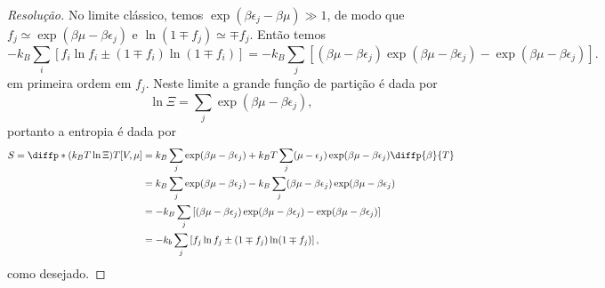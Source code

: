 \begin{proof}[Resolução]
    No limite clássico, temos \(\exp(\beta \epsilon_j - \beta \mu) \gg 1\), de modo que \(f_j \simeq \exp(\beta \mu - \beta \epsilon_j)\) e \(\ln(1 \mp f_j) \simeq \mp f_j\). Então temos
    \begin{equation*}
        -k_B \sum_i\left[f_i \ln f_i \pm (1 \mp f_i)\ln(1 \mp f_i)\right] = -k_B \sum_j \left[(\beta \mu - \beta \epsilon_j) \exp(\beta \mu -\beta \epsilon_j) - \exp(\beta \mu - \beta \epsilon_j)\right].
    \end{equation*}
    em primeira ordem em \(f_j\). Neste limite a grande função de partição é dada por
    \begin{equation*}
        \ln\Xi = \sum_j \exp(\beta \mu - \beta \epsilon_j),
    \end{equation*}
    portanto a entropia é dada por
    \begin{align*}
        S = \diffp*{(k_B T \ln\Xi)}{T}[V, \mu] &= k_B \sum_j \exp(\beta \mu - \beta \epsilon_j) + k_B T \sum_j (\mu - \epsilon_j)\exp(\beta \mu - \beta \epsilon_j) \diffp{\beta}{T}\\
                                               &= k_B \sum_j \exp(\beta \mu - \beta \epsilon_j) - k_B \sum_j (\beta \mu - \beta \epsilon_j) \exp(\beta \mu - \beta \epsilon_j)\\
                                               &= -k_B\sum_j\left[(\beta \mu - \beta \epsilon_j)\exp(\beta \mu - \beta \epsilon_j) - \exp(\beta \mu - \beta \epsilon_j)\right]\\
                                               &= -k_b \sum_{j} \left[f_j \ln f_j \pm (1 \mp f_j)\ln(1 \mp f_j)\right],
    \end{align*}
    como desejado.
\end{proof}
